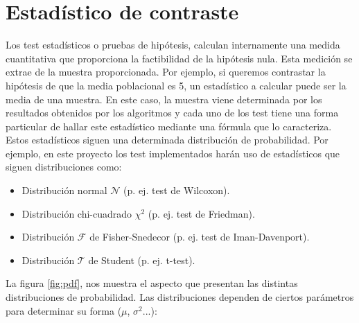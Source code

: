 \section{Estadístico de contraste} \label{estadistico}
Los test estadísticos o pruebas de hipótesis, calculan internamente una medida cuantitativa que proporciona la
factibilidad de la hipótesis nula. Esta medición se extrae de la muestra proporcionada. Por ejemplo, si queremos
contrastar la hipótesis de que la media poblacional es 5, un estadístico a calcular puede ser la media de una
muestra. En este caso, la muestra viene determinada por los resultados obtenidos por los algoritmos y cada uno de
los test tiene una forma particular de hallar este estadístico mediante una fórmula que lo caracteriza. Estos
estadísticos siguen una determinada distribución de probabilidad. Por ejemplo, en este proyecto los test
implementados harán uso de estadísticos que siguen distribuciones como:
\begin{itemize}
\item Distribución normal $\mathcal{N}$ (p. ej. test de Wilcoxon).
\item Distribución chi-cuadrado $\chi^2$ (p. ej. test de Friedman).
\item Distribución $\mathcal{F}$ de Fisher-Snedecor (p. ej. test de Iman-Davenport).
\item Distribución $\mathcal{T}$ de Student (p. ej. t-test).
\end{itemize}
La figura \ref{fig:pdf}, nos muestra el aspecto que presentan las distintas distribuciones de probabilidad. Las
distribuciones dependen de ciertos parámetros para determinar su forma ($\mu$, $\sigma^2$...): 
\begin{figure}[h]
\centering
{}
\end{figure}
